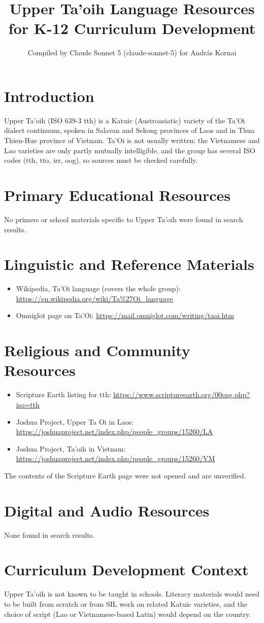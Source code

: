 \documentclass[12pt]{article}
\title{Upper Ta'oih Language Resources for K-12 Curriculum Development}
\author{Compiled by Claude Sonnet 5 (claude-sonnet-5) for Andr\'as Kornai}
\date{}
\begin{document}
\maketitle
\section{Introduction}
Upper Ta'oih (ISO 639-3 tth) is a Katuic (Austroasiatic) variety of the Ta'Oi dialect continuum, spoken in Salavan and Sekong provinces of Laos and in Thua Thien-Hue province of Vietnam. Ta'Oi is not usually written; the Vietnamese and Lao varieties are only partly mutually intelligible, and the group has several ISO codes (tth, tto, irr, oog), so sources must be checked carefully.
\section{Primary Educational Resources}
No primers or school materials specific to Upper Ta'oih were found in search results.
\section{Linguistic and Reference Materials}
\begin{itemize}
\item Wikipedia, Ta'Oi language (covers the whole group): \url{https://en.wikipedia.org/wiki/Ta%27Oi_language}
\item Omniglot page on Ta'Oi: \url{https://mail.omniglot.com/writing/taoi.htm}
\end{itemize}
\section{Religious and Community Resources}
\begin{itemize}
\item Scripture Earth listing for tth: \url{https://www.scriptureearth.org/00eng.php?iso=tth}
\item Joshua Project, Upper Ta Oi in Laos: \url{https://joshuaproject.net/index.php/people_groups/15260/LA}
\item Joshua Project, Ta'oih in Vietnam: \url{https://joshuaproject.net/index.php/people_groups/15260/VM}
\end{itemize}
The contents of the Scripture Earth page were not opened and are unverified.
\section{Digital and Audio Resources}
None found in search results.
\section{Curriculum Development Context}
Upper Ta'oih is not known to be taught in schools. Literacy materials would need to be built from scratch or from SIL work on related Katuic varieties, and the choice of script (Lao or Vietnamese-based Latin) would depend on the country.
\end{document}
